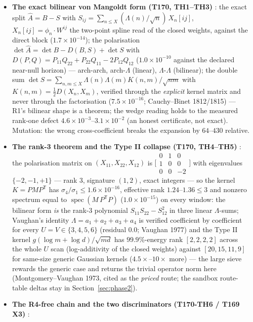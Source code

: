 \documentclass[11pt,a4paper]{article}
\begin{document}
\begin{itemize}[leftmargin=1.5em]
closed constant $1/\sqrt2$ overshoots $\nu_2$ by $17.1$--$2.3\times10^{2}$.
\item \textbf{The exact bilinear von Mangoldt form (T170, TH1--TH3)} \mE: the exact
split $\hat A=B-S$ with $S_{ij}=\sum_{n\le X}(\Lambda(n)/\sqrt n)\,X_n[ij]$,
$X_n[ij]=\phi_n\cdot W^{ij}$ the two-point spline read of the closed weights, against
the direct block ($1.7\times10^{-14}$); the polarisation
$\det\hat A=\det B-D(B,S)+\det S$ with $D(P,Q)=P_{11}Q_{22}+P_{22}Q_{11}-2P_{12}Q_{12}$
($1.0\times10^{-10}$ against the declared near-null horizon) --- arch-arch,
arch-$\Lambda$ (linear), $\Lambda$-$\Lambda$ (bilinear); the double sum
$\det S=\sum_{n,m\le X}\Lambda(n)\Lambda(m)K(n,m)/\sqrt{nm}$ with
$K(n,m)=\tfrac12D(X_n,X_m)$, verified through the \emph{explicit} kernel matrix and
never through the factorisation ($7.5\times10^{-16}$; Cauchy--Binet 1812/1815) --- R1's
bilinear shape is a theorem; the wedge reading holds to the measured rank-one defect
$4.6\times10^{-3}$--$3.1\times10^{-2}$ (an honest certificate, not exact). Mutation:
the wrong cross-coefficient breaks the expansion by $64$--$430$ relative.
\item \textbf{The rank-3 theorem and the Type II collapse (T170, TH4--TH5)} \mE: the
polarisation matrix on $(X_{11},X_{22},X_{12})$ is
$\bigl[\begin{smallmatrix}0&1&0\\1&0&0\\0&0&-2\end{smallmatrix}\bigr]$ with eigenvalues
$\{-2,-1,+1\}$ --- rank $3$, signature $(1,2)$, exact integers --- so the kernel
$K=PMP^{\mathsf T}$ has $\sigma_4/\sigma_1\le1.6\times10^{-16}$, effective rank
$1.24$--$1.36\le3$ and nonzero spectrum equal to
$\operatorname{spec}(M\,P^{\mathsf T}P)$ ($1.0\times10^{-15}$) on every window: the
bilinear form \emph{is} the rank-3 polynomial $S_{11}S_{22}-S_{12}^2$ in three linear
$\Lambda$-sums; Vaughan's identity $\Lambda=a_1+a_2+a_3+a_4$ is verified coefficient by
coefficient for every $U=V\in\{3,4,5,6\}$ (residual $0.0$; Vaughan 1977) and the Type
II kernel $g(\log m+\log d)/\sqrt{md}$ has $99.9\%$-energy rank $[2,2,2,2]$ across the
whole $U$ scan (log-additivity of the closed weights) against $[20,15,11,9]$ for
same-size generic Gaussian kernels ($4.5\times$--$10\times$ more) --- the large sieve
rewards the generic case and returns the trivial operator norm here
(Montgomery--Vaughan 1973, cited as the \emph{priced} route; the sandbox route-table
deltas stay in Section~\ref{sec:phase2}).
\item \textbf{The R4-free chain and the two discriminators (T170-TH6 / T169 X3)} \mE:

\end{itemize}
\end{document}
